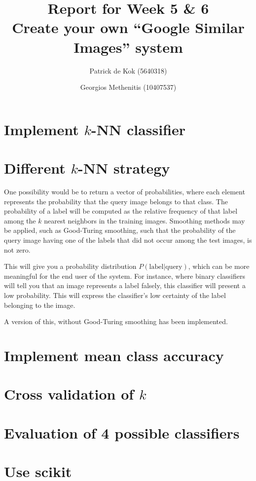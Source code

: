 \documentclass[a4paper,10pt,twoside]{article}
\title{Report for Week 5 \& 6\\\normalsize Create your own ``Google Similar Images'' system}
\author{Patrick de Kok (5640318) \and Georgios Methenitis (10407537)}
\begin{document}
\maketitle
\thispagestyle{empty}

\section{Implement $k$-NN classifier}

\section{Different $k$-NN strategy}
One possibility would be to return a vector of probabilities, where each element represents the probability that the query image belongs to that class.  The probability of a label will be computed as the relative frequency of that label among the $k$ nearest neighbors in the training images.  Smoothing methods may be applied, such as Good-Turing smoothing, such that the probability of the query image having one of the labels that did not occur among the test images, is not zero.

This will give you a probability distribution $P(\mbox{label} | \mbox{query})$, which can be more meaningful for the end user of the system.  For instance, where binary classifiers will tell you that an image represents a label falsely, this classifier will present a low probability.  This will express the classifier's low certainty of the label belonging to the image.

A version of this, without Good-Turing smoothing has been implemented. %

\section{Implement mean class accuracy}

\section{Cross validation of $k$}

\section{Evaluation of 4 possible classifiers}

\section{Use scikit}
\end{document}
